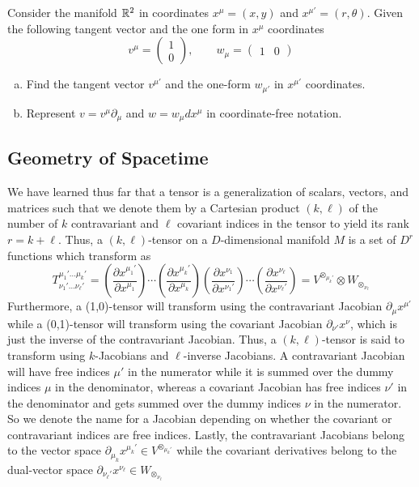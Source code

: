 \documentclass{article}
\begin{document}
 			\begin{exe}
 				Consider the manifold $\mathbb{R}^2$ in coordinates $x^\mu = (x,y)$ and $x^{\mu'} = (r, \theta)$. Given the following tangent vector and the one form in $x^\mu$ coordinates $$ v^\mu = \begin{pmatrix}
 					1 \\ 0
 				\end{pmatrix}, \quad\quad w_\mu = \begin{pmatrix}
 				1 & 0
 			\end{pmatrix}$$
 				\begin{enumerate}[(a)]
 					\item Find the tangent vector $v^{\mu'}$ and the one-form $w_{\mu'}$ in $x^{\mu'}$ coordinates.
 					\item Represent $v = v^\mu \partial_\mu$ and $w = w_\mu dx^\mu$ in coordinate-free notation.
 				\end{enumerate}
 			\end{exe}
 		\pagebreak
 		
 		\subsection{Geometry of Spacetime}
 			We have learned thus far that a tensor is a generalization of scalars, vectors, and matrices such that we denote them by a Cartesian product $(k, \ell)$ of the number of $k$ contravariant and $\ell$ covariant indices in the tensor to yield its rank $r=k+\ell$. Thus, a $(k, \ell)$-tensor on a $D$-dimensional manifold $M$ is a set of $D^{r}$ functions which transform as
 			$$ T^{\mu_1' \dots \mu_k'}_{\nu_1' \dots \nu_\ell'} = \left( \frac{\partial x^{\mu_1'}}{\partial x^{\mu_1}} \right) \cdots \left( \frac{\partial x^{\mu_k'}}{\partial x^{\mu_k}} \right) \left( \frac{\partial x^{\nu_1}}{\partial x^{\nu_1'}} \right) \cdots \left( \frac{\partial x^{\nu_\ell}}{\partial x^{\nu_\ell'}} \right) = V^{\otimes_{\mu_k'}} \otimes W_{\otimes_{\nu_\ell}}$$
 			Furthermore, a (1,0)-tensor will transform using the contravariant Jacobian $\partial_\mu x^{\mu'}$ while a (0,1)-tensor will transform using the covariant Jacobian $\partial_{\nu'} x^\nu$, which is just the inverse of the contravariant Jacobian. Thus, a $(k, \ell)$-tensor is said to transform using $k$-Jacobians and $\ell$-inverse Jacobians. A contravariant Jacobian will have free indices $\mu'$ in the numerator while it is summed over the dummy indices $\mu$ in the denominator, whereas a covariant Jacobian has free indices $\nu'$ in the denominator and gets summed over the dummy indices $\nu$ in the numerator. So we denote the name for a Jacobian depending on whether the covariant or contravariant indices are free indices. Lastly, the contravariant Jacobians belong to the vector space $\partial_{\mu_k} x^{\mu_k '} \in V^{\otimes_{\mu_k'}}$ while the covariant derivatives belong to the dual-vector space $\partial_{\nu_\ell '} x^{\nu_\ell} \in W_{\otimes_{\nu_\ell}}$
 			
\end{document}
